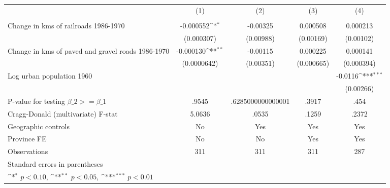 {
\def\sym#1{\ifmmode^{#1}\else\(^{#1}\)\fi}
\begin{tabular}{l*{4}{c}}
\hline\hline
                &\multicolumn{1}{c}{(1)}&\multicolumn{1}{c}{(2)}&\multicolumn{1}{c}{(3)}&\multicolumn{1}{c}{(4)}\\
                &\multicolumn{1}{c}{}&\multicolumn{1}{c}{}&\multicolumn{1}{c}{}&\multicolumn{1}{c}{}\\
\hline
Change in kms of railroads 1986-1970&-0.000552\sym{*}  & -0.00325         & 0.000508         & 0.000213         \\
                &(0.000307)         &(0.00988)         &(0.00169)         &(0.00102)         \\
[1em]
Change in kms of paved and gravel roads 1986-1970&-0.000130\sym{**} & -0.00115         & 0.000225         & 0.000141         \\
                &(0.0000642)         &(0.00351)         &(0.000665)         &(0.000394)         \\
[1em]
Log urban population 1960&                  &                  &                  &  -0.0116\sym{***}\\
                &                  &                  &                  &(0.00266)         \\
\hline
P-value for testing $\beta\_{2} >= \beta\_{1}$&    .9545         &.6285000000000001         &    .3917         &     .454         \\
Cragg-Donald (multivariate) F-stat&   5.0636         &    .0535         &    .1259         &    .2372         \\
Geographic controls&       No         &      Yes         &      Yes         &      Yes         \\
Province FE     &       No         &       No         &      Yes         &      Yes         \\
Observations    &      311         &      311         &      311         &      287         \\
\hline\hline
\multicolumn{5}{l}{\footnotesize Standard errors in parentheses}\\
\multicolumn{5}{l}{\footnotesize \sym{*} \(p<0.10\), \sym{**} \(p<0.05\), \sym{***} \(p<0.01\)}\\
\end{tabular}
}
